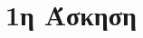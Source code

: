 \documentclass[assignment3.tex]{subfiles}
\begin{document}
\section*{1η Άσκηση}




%
\end{document}
